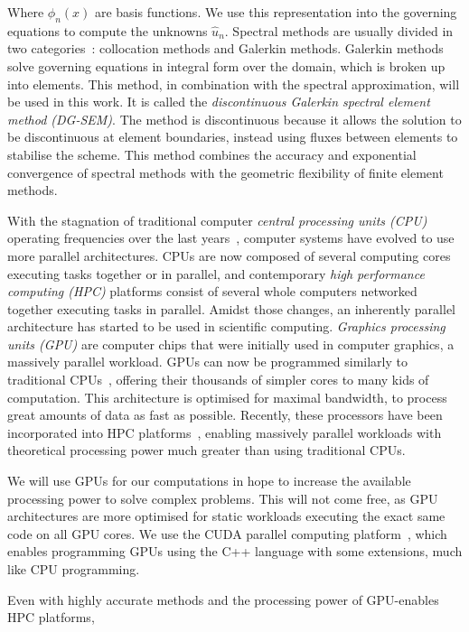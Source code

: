 Where $\phi _n(x)$ are basis functions. We use this representation into the governing equations to
compute the unknowns $\widehat{u}_n$. Spectral methods are usually divided in two
categories~\cite{Karniadakis2005}: collocation methods and Galerkin methods. Galerkin methods solve
governing equations in integral form over the domain, which is broken up into elements. This method,
in combination with the spectral approximation, will be used in this work. It is called the
\textit{discontinuous Galerkin spectral element method (DG-SEM)}. The method is discontinuous
because it allows the solution to be discontinuous at element boundaries, instead using fluxes
between elements to stabilise the scheme. This method combines the accuracy and exponential
convergence of spectral methods with the geometric flexibility of finite element methods. 

With the stagnation of traditional computer \textit{central processing units (CPU)} operating
frequencies over the last years~\cite{Parkhurst2006}, computer systems have evolved to use more
parallel architectures. CPUs are now composed of several computing cores~\cite{Nayfeh1997} executing
tasks together or in parallel, and contemporary \textit{high performance computing (HPC)} platforms
consist of several whole computers networked together executing tasks in parallel. Amidst those
changes, an inherently parallel architecture has started to be used in scientific computing.
\textit{Graphics processing units (GPU)} are computer chips that were initially used in computer
graphics, a massively parallel workload. GPUs can now be programmed similarly to traditional
CPUs~\cite{Owens2008}, offering their thousands of simpler cores to many kids of computation. This
architecture is optimised for maximal bandwidth, to process great amounts of data as fast as
possible. Recently, these processors have been incorporated into HPC platforms~\cite{Fan2004},
enabling massively parallel workloads with theoretical processing power much greater than using
traditional CPUs.

We will use GPUs for our computations in hope to increase the available processing power to solve
complex problems. This will not come free, as GPU architectures are more optimised for static
workloads executing the exact same code on all GPU cores. We use the CUDA parallel computing
platform~\cite{Garland2008}, which enables programming GPUs using the C++ language with some
extensions, much like CPU programming.

Even with highly accurate methods and the processing power of GPU-enables HPC platforms, 


